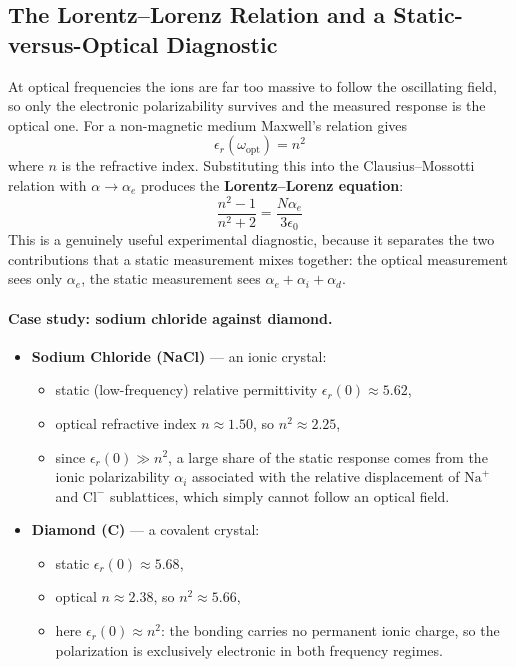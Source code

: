 \documentclass[11pt,a4paper]{article}
\begin{document}
\subsection{The Lorentz--Lorenz Relation and a Static-versus-Optical Diagnostic}
At optical frequencies the ions are far too massive to follow the oscillating field, so only the electronic polarizability survives and the measured response is the optical one. For a non-magnetic medium Maxwell's relation gives
\begin{equation}
    \epsilon_r(\omega_{\text{opt}}) = n^2
\end{equation}
where $n$ is the refractive index. Substituting this into the Clausius--Mossotti relation with $\alpha \to \alpha_e$ produces the \textbf{Lorentz--Lorenz equation}:
\begin{equation}
    \frac{n^2 - 1}{n^2 + 2} = \frac{N\alpha_e}{3\epsilon_0}
\end{equation}
This is a genuinely useful experimental diagnostic, because it separates the two contributions that a static measurement mixes together: the optical measurement sees only $\alpha_e$, the static measurement sees $\alpha_e + \alpha_i + \alpha_d$.

\paragraph{Case study: sodium chloride against diamond.}
\begin{itemize}
    \item \textbf{Sodium Chloride (NaCl)} --- an ionic crystal:
    \begin{itemize}
        \item static (low-frequency) relative permittivity $\epsilon_r(0) \approx 5.62$,
        \item optical refractive index $n \approx 1.50$, so $n^2 \approx 2.25$,
        \item since $\epsilon_r(0) \gg n^2$, a large share of the static response comes from the ionic polarizability $\alpha_i$ associated with the relative displacement of $\text{Na}^+$ and $\text{Cl}^-$ sublattices, which simply cannot follow an optical field.
    \end{itemize}
    \item \textbf{Diamond (C)} --- a covalent crystal:
    \begin{itemize}
        \item static $\epsilon_r(0) \approx 5.68$,
        \item optical $n \approx 2.38$, so $n^2 \approx 5.66$,
        \item here $\epsilon_r(0) \approx n^2$: the bonding carries no permanent ionic charge, so the polarization is exclusively electronic in both frequency regimes.
    \end{itemize}
\end{itemize}
\end{document}
